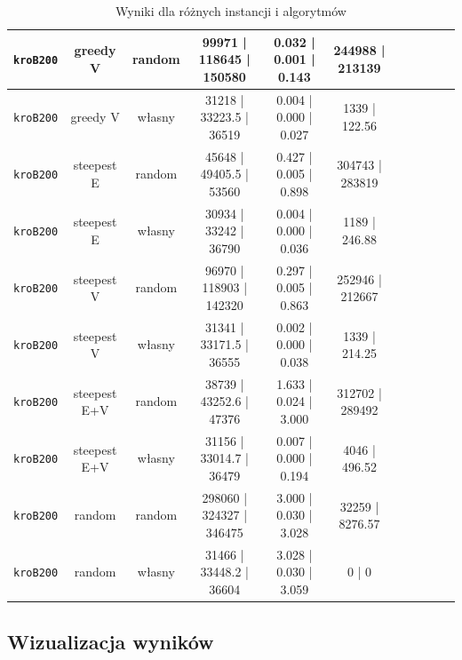 \documentclass[11pt]{article}
\begin{document}
\begin{table}[ht]
\begin{tabular}{|c|c|c||c|c|c||c|c|c||c|c|}
\texttt{kroB200} & greedy V & random & 99971 | 118645 | 150580 & 0.032 | 0.001 | 0.143 & 244988 | 213139 \\ \hline
\texttt{kroB200} & greedy V & własny & 31218 | 33223.5 | 36519 & 0.004 | 0.000 | 0.027 & 1339 | 122.56 \\ \hline
\texttt{kroB200} & steepest E & random & 45648 | 49405.5 | 53560 & 0.427 | 0.005 | 0.898 & 304743 | 283819 \\ \hline
\texttt{kroB200} & steepest E & własny & 30934 | 33242 | 36790 & 0.004 | 0.000 | 0.036 & 1189 | 246.88 \\ \hline
\texttt{kroB200} & steepest V & random & 96970 | 118903 | 142320 & 0.297 | 0.005 | 0.863 & 252946 | 212667 \\ \hline
\texttt{kroB200} & steepest V & własny & 31341 | 33171.5 | 36555 & 0.002 | 0.000 | 0.038 & 1339 | 214.25 \\ \hline
\texttt{kroB200} & steepest E+V & random & 38739 | 43252.6 | 47376 & 1.633 | 0.024 | 3.000 & 312702 | 289492 \\ \hline
\texttt{kroB200} & steepest E+V & własny & 31156 | 33014.7 | 36479 & 0.007 | 0.000 | 0.194 & 4046 | 496.52 \\ \hline
\texttt{kroB200} & random & random & 298060 | 324327 | 346475 & 3.000 | 0.030 | 3.028 & 32259 | 8276.57 \\ \hline
\texttt{kroB200} & random & własny & 31466 | 33448.2 | 36604 & 3.028 | 0.030 | 3.059 & 0 | 0 \\ \hline
\end{tabular}
\caption{Wyniki dla różnych instancji i algorytmów}\label{tab:table}
\end{table}


\subsection{Wizualizacja wyników}\label{subsec:wizualizacja-wynikow}
\end{document}
